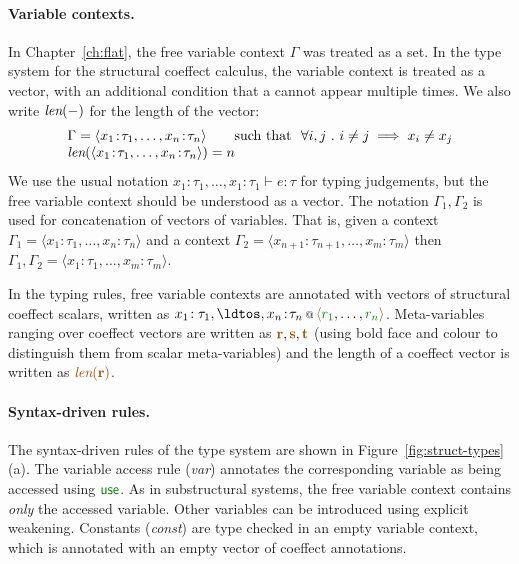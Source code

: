 
\paragraph{Variable contexts.}
In Chapter~\ref{ch:flat}, the free variable context $\Gamma$ was treated as a set. In the type
system for the structural coeffect calculus, the variable context is treated as a vector, with
an additional condition that a cannot appear multiple times. We also write ${\textit{len}(-)}$ for the
length of the vector:
%
\begin{equation*}
\begin{array}{l}
 \Gamma = \langle x_1\!:\!\tau_1, \ldots, x_n\!:\!\tau_n \rangle \qquad \textnormal{such that}~~\forall i, j ~.~ i \neq j \implies x_i \neq x_j\\
 \xlen{\langle x_1\!:\!\tau_1, \ldots, x_n\!:\!\tau_n \rangle} = n
\end{array}
\end{equation*}
%
We use the usual notation $x_1\!:\!\tau_1, \ldots, x_1\!:\!\tau_1 \vdash e : \tau$ for
typing judgements, but the free variable context should be understood as a vector.
The notation $\Gamma_1, \Gamma_2$ is used for concatenation of vectors of variables. That is,
given a context $\Gamma_1 = \langle x_1\!:\!\tau_1, \ldots, x_n\!:\!\tau_n \rangle $ and a context
$\Gamma_2 = \langle x_{n+1}\!:\!\tau_{n+1}, \ldots, x_m\!:\!\tau_m \rangle $ then
$\Gamma_1, \Gamma_2 = \langle x_1\!:\!\tau_1, \ldots, x_m\!:\!\tau_m \rangle$.

In the typing rules, free variable contexts are annotated with vectors of structural coeffect scalars,
written as $\coctx{x_1\!:\tau_1,\ldtos,x_n\!:\!\tau_n}{\alift{\cclrd{r_1}, \ldots, \cclrd{r_n}}}$.
Meta-variables ranging over coeffect vectors are written as $\aclrd{\textbf{r}}, \aclrd{\textbf{s}}, \aclrd{\textbf{t}}$
(using bold face and colour to distinguish them from scalar meta-variables) and the length of a
coeffect vector is written as $\alen{\aclrd{\textbf{r}}}$.

\paragraph{Syntax-driven rules.}
The syntax-driven rules of the type system are shown in Figure~\ref{fig:struct-types} (a).
The variable access rule (\emph{var}) annotates the corresponding variable as being accessed
using $\cunit$. As in substructural systems, the free variable context contains
\emph{only} the accessed variable. Other variables can be introduced using explicit weakening.
Constants (\emph{const}) are type checked in an empty variable context, which is annotated with
an empty vector of coeffect annotations.


